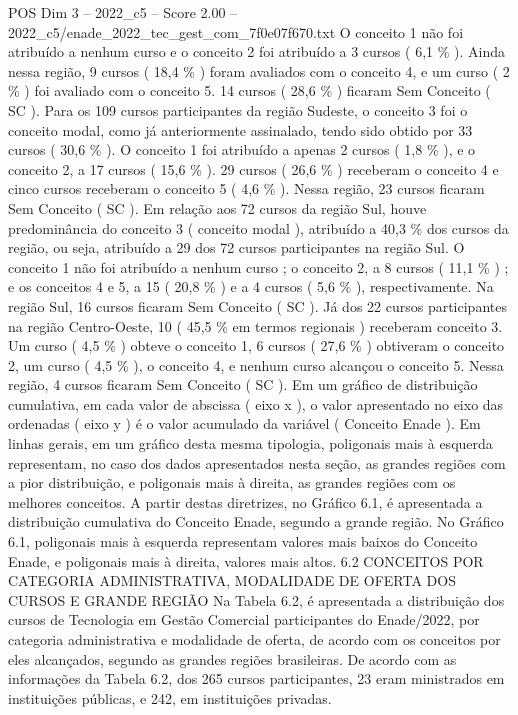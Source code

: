 \begin{textsample}{POS Dim 3 – 2022\_c5 – Score 2.00 – 2022\_c5/enade\_2022\_tec\_gest\_com\_7f0e07f670.txt}
O conceito 1 não foi atribuído a nenhum curso e o conceito 2 foi atribuído a 3 cursos ( 6,1 \% ).
Ainda nessa região, 9 cursos ( 18,4 \% ) foram avaliados com o conceito 4, e um curso ( 2 \% ) foi avaliado com o conceito 5. 14 cursos ( 28,6 \% ) ficaram Sem Conceito ( SC ).
Para os 109 cursos participantes da região Sudeste, o conceito 3 foi o conceito modal, como já anteriormente assinalado, tendo sido obtido por 33 cursos ( 30,6 \% ).
O conceito 1 foi atribuído a apenas 2 cursos ( 1,8 \% ), e o conceito 2, a 17 cursos ( 15,6 \% ). 29 cursos ( 26,6 \% ) receberam o conceito 4 e cinco cursos receberam o conceito 5 ( 4,6 \% ).
Nessa região, 23 cursos ficaram Sem Conceito ( SC ).
Em relação aos 72 cursos da região Sul, houve predominância do conceito 3 ( conceito modal ), atribuído a 40,3 \% dos cursos da região, ou seja, atribuído a 29 dos 72 cursos participantes na região Sul.
O conceito 1 não foi atribuído a nenhum curso ; o conceito 2, a 8 cursos ( 11,1 \% ) ; e os conceitos 4 e 5, a 15 ( 20,8 \% ) e a 4 cursos ( 5,6 \% ), respectivamente.
Na região Sul, 16 cursos ficaram Sem Conceito ( SC ).
Já dos 22 cursos participantes na região Centro-Oeste, 10 ( 45,5 \% em termos regionais ) receberam conceito 3.
Um curso ( 4,5 \% ) obteve o conceito 1, 6 cursos ( 27,6 \% ) obtiveram o conceito 2, um curso ( 4,5 \% ), o conceito 4, e nenhum curso alcançou o conceito 5.
Nessa região, 4 cursos ficaram Sem Conceito ( SC ).
Em um gráfico de distribuição cumulativa, em cada valor de abscissa ( eixo x ), o valor apresentado no eixo das ordenadas ( eixo y ) é o valor acumulado da variável ( Conceito Enade ).
Em linhas gerais, em um gráfico desta mesma tipologia, poligonais mais à esquerda representam, no caso dos dados apresentados nesta seção, as grandes regiões com a pior distribuição, e poligonais mais à direita, as grandes regiões com os melhores conceitos.
A partir destas diretrizes, no Gráfico 6.1, é apresentada a distribuição cumulativa do Conceito Enade, segundo a grande região.
No Gráfico 6.1, poligonais mais à esquerda representam valores mais baixos do Conceito Enade, e poligonais mais à direita, valores mais altos. 6.2 CONCEITOS POR CATEGORIA ADMINISTRATIVA, MODALIDADE DE OFERTA DOS CURSOS E GRANDE REGIÃO Na Tabela 6.2, é apresentada a distribuição dos cursos de Tecnologia em Gestão Comercial participantes do Enade/2022, por categoria administrativa e modalidade de oferta, de acordo com os conceitos por eles alcançados, segundo as grandes regiões brasileiras.
De acordo com as informações da Tabela 6.2, dos 265 cursos participantes, 23 eram ministrados em instituições públicas, e 242, em instituições privadas.

\end{textsample}
